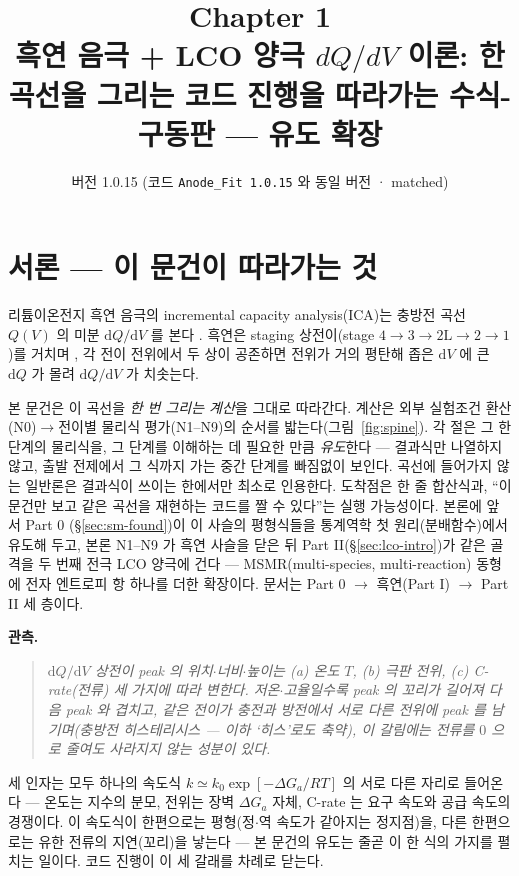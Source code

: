 \documentclass[11pt,a4paper]{article}
\title{\textbf{\LARGE Chapter 1}\\[0.35em]\Large 흑연 음극 + LCO 양극 $dQ/dV$ 이론: 한 곡선을 그리는 코드 진행을 따라가는 수식-구동판 — 유도 확장}
\author{}
\date{\normalsize 버전 1.0.15 \quad(코드 \texttt{Anode\_Fit 1.0.15} 와 동일 버전 · matched)}
\newcommand{\dd}{\mathrm{d}}
\begin{document}
\maketitle

\section*{서론 — 이 문건이 따라가는 것}
리튬이온전지 흑연 음극의 incremental capacity analysis(ICA)는 충방전 곡선 $Q(V)$ 의 미분
$\dd Q/\dd V$ 를 본다 \cite{bloom2005,dubarry2012}. 흑연은 staging 상전이(stage
$4\!\to\!3\!\to\!2\mathrm L\!\to\!2\!\to\!1$)를 거치며 \cite{dahn1991,ohzuku1993}, 각 전이 전위에서
두 상이 공존하면 전위가 거의 평탄해 좁은 $\dd V$ 에 큰 $\dd Q$ 가 몰려 $\dd Q/\dd V$ 가 치솟는다.

본 문건은 이 곡선을 \emph{한 번 그리는 계산}을 그대로 따라간다. 계산은 외부 실험조건 환산(N0)$\to$전이별
물리식 평가(N1--N9)의 순서를 밟는다(그림~\ref{fig:spine}). 각 절은 그 한 단계의 물리식을, 그 단계를 이해하는 데 필요한 만큼
\emph{유도}한다 — 결과식만 나열하지 않고, 출발 전제에서 그 식까지 가는 중간 단계를 빠짐없이 보인다. 곡선에 들어가지 않는 일반론은 결과식이 쓰이는 한에서만 최소로 인용한다. 도착점은 한 줄
합산식과, ``이 문건만 보고 같은 곡선을 재현하는 코드를 짤 수 있다''는 실행 가능성이다. 본론에 앞서 Part 0
(\S\ref{sec:sm-found})이 이 사슬의 평형식들을 통계역학 첫 원리(분배함수)에서 유도해 두고, 본론 N1--N9 가 흑연
사슬을 닫은 뒤 Part II(\S\ref{sec:lco-intro})가 같은 골격을 두 번째 전극 LCO 양극에 건다 — MSMR(multi-species,
multi-reaction) 동형에 전자 엔트로피 항 하나를 더한 확장이다. 문서는 Part 0 $\to$ 흑연(Part I) $\to$ Part II 세 층이다.

\textbf{관측.}
\begin{quote}\itshape
$\dd Q/\dd V$ 상전이 peak 의 위치$\cdot$너비$\cdot$높이는 (a) 온도 $T$, (b) 극판 전위, (c) C-rate(전류)
세 가지에 따라 변한다. 저온$\cdot$고율일수록 peak 의 꼬리가 길어져 다음 peak 와 겹치고, 같은 전이가 충전과 방전에서
서로 다른 전위에 peak 를 남기며(충방전 히스테리시스 — 이하 `히스'로도 축약), 이 갈림에는 전류를 $0$ 으로 줄여도 사라지지 않는 성분이 있다.
\end{quote}

세 인자는 모두 하나의 속도식 $k\simeq k_0\exp[-\Delta G_a/RT]$ 의 서로 다른 자리로 들어온다 — 온도는 지수의 분모,
전위는 장벽 $\Delta G_a$ 자체, C-rate 는 요구 속도와 공급 속도의 경쟁이다. 이 속도식이 한편으로는 평형(정$\cdot$역
속도가 같아지는 정지점)을, 다른 한편으로는 유한 전류의 지연(꼬리)을 낳는다 — 본 문건의 유도는 줄곧 이 한 식의 가지를
펼치는 일이다. 코드 진행이 이 세 갈래를 차례로 닫는다.
\end{document}
